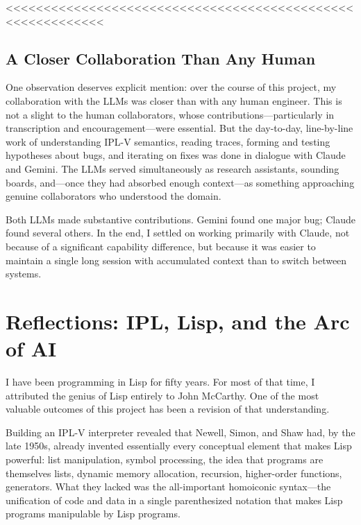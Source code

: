\documentclass[journal]{IEEEtran}
\begin{document}
<<<<<<<<<<<<<<<<<<<<<<<<<<<<<<<<<<<<<<<<<<<<<<<<<<<<<<<<<<<

\subsection{A Closer Collaboration Than Any Human}

One observation deserves explicit mention: over the course of this
project, my collaboration with the LLMs was closer than with any human
engineer. This is not a slight to the human collaborators, whose
contributions---particularly in transcription and encouragement---were
essential. But the day-to-day, line-by-line work of understanding
IPL-V semantics, reading traces, forming and testing hypotheses about
bugs, and iterating on fixes was done in dialogue with Claude and
Gemini. The LLMs served simultaneously as research assistants,
sounding boards, and---once they had absorbed enough context---as
something approaching genuine collaborators who understood the domain.

Both LLMs made substantive contributions. Gemini found one major bug;
Claude found several others. In the end, I settled on working
primarily with Claude, not because of a significant capability
difference, but because it was easier to maintain a single long
session with accumulated context than to switch between systems.

\section{Reflections: IPL, Lisp, and the Arc of AI}
\label{sec:reflections}

I have been programming in Lisp for fifty years. For most of that
time, I attributed the genius of Lisp entirely to John McCarthy. One
of the most valuable outcomes of this project has been a revision of
that understanding.

Building an IPL-V interpreter revealed that Newell, Simon, and Shaw
had, by the late 1950s, already invented essentially every conceptual
element that makes Lisp powerful: list manipulation, symbol processing,
the idea that programs are themselves lists, dynamic memory allocation,
recursion, higher-order functions, generators. What they lacked was
the all-important homoiconic syntax---the unification of code and data
in a single parenthesized notation that makes Lisp programs
manipulable by Lisp programs.
\end{document}
